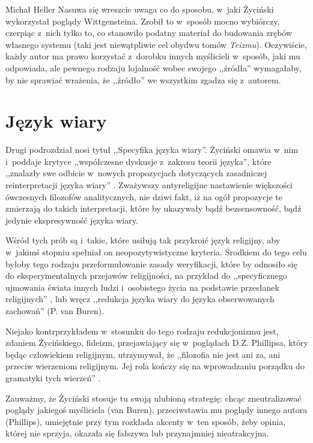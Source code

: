\begin{artplenv}{Michał Heller}
Nasuwa się wreszcie uwaga co do sposobu, w~jaki Życiński wykorzystał poglądy Wittgensteina. Zrobił to w~sposób mocno wybiórczy, czerpiąc z~nich tylko to, co stanowiło podatny materiał do budowania zrębów własnego systemu (taki jest niewątpliwie cel obydwu tomów \textit{Teizmu}). Oczywiście, każdy autor ma prawo korzystać z~dorobku innych myślicieli w~sposób, jaki mu odpowiada, ale pewnego rodzaju lojalność wobec swojego ,,źródła'' wymagałaby, by nie sprawiać wrażenia, że ,,źródło'' we wszystkim zgadza się z~autorem.

\section{Język wiary}
Drugi podrozdział nosi tytuł ,,Specyfika języka wiary''. Życiński omawia w~nim i~poddaje krytyce ,,współczesne dyskusje z~zakresu teorii języka'', które ,,znalazły swe odbicie w~nowych propozycjach dotyczących zasadniczej reinterpretacji języka wiary''
\parencite[][s.~22–23]{zycinski_teizm_1985}. %
 Zważywszy antyreligijne nastawienie większości ówczesnych filozofów analitycznych, nie dziwi fakt, iż na ogół propozycje te zmierzają do takich interpretacji, które by ukazywały bądź bezsensowność, bądź jedynie ekspresywność języka wiary.

Wśród tych prób są i~takie, które usiłują tak przykroić język religijny, aby w~jakimś stopniu spełniał on neopozytywistyczne kryteria. Środkiem do tego celu byłoby tego rodzaju przeformułowanie zasady weryfikacji, które by odnosiło się do eksperymentalnych przejawów religijności, na przykład do ,,specyficznego ujmowania świata innych ludzi i~osobistego życia na podstawie przesłanek religijnych''
\parencite[][s.~23]{zycinski_teizm_1985}, %
 lub wręcz ,,redukcja języka wiary do języka obserwowanych zachowań'' 
\parencite[][s.~25]{zycinski_teizm_1985} %
 (P. van Buren).

Niejako kontrprzykładem w~stosunku do tego rodzaju redukcjonizmu jest, zdaniem Życińskiego, fideizm, przejawiający się w~poglądach D.Z. Phillipsa, który będąc człowiekiem religijnym, utrzymywał, że ,,filozofia nie jest ani za, ani przeciw wierzeniom religijnym. Jej rola kończy się na wprowadzaniu porządku do gramatyki tych wierzeń''
\parencite[][s.~26]{zycinski_teizm_1985}.%


Zauważmy, że Życiński stosuje tu swoją ulubioną strategię: chcąc zneutralizować poglądy jakiegoś myśliciela (van Buren), przeciwstawia mu poglądy innego autora (Phillips), umiejętnie przy tym rozkłada akcenty w~ten sposób, żeby opinia, której nie sprzyja, okazała się fałszywa lub przynajmniej nieatrakcyjna.


\end{artplenv}
